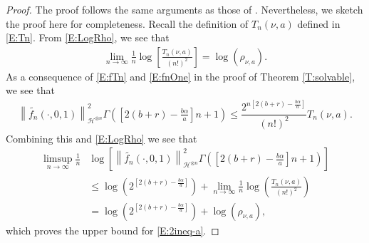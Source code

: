 \documentclass[a4paper,11pt]{article}
\numberwithin{equation}{section}
\numberwithin{equation}{section}
\theoremstyle{plain}
\theoremstyle{definition}
\newcommand{\Norm}[1]{\left\|  #1   \right\|}
\begin{document}
\begin{proof}
  The proof follows the same arguments as those of \cite[Lemma 4.3]{BCC21}. Nevertheless, we sketch
  the proof here for completeness. Recall the definition of $T_n(\nu,a)$ defined in \eqref{E:Tn}.
  From \eqref{E:LogRho}, we see that
  \begin{align} \label{E:LimTn}
    \lim_{n \to \infty} \frac{1}{n} \log \left[ \frac{T_n(\nu,a)}{(n!)^2} \right]
    = \log\left(\rho_{\nu,a}\right).
  \end{align}
  As a consequence of \eqref{E:fTn} and \eqref{E:fnOne} in the proof of Theorem \ref{T:solvable}, we
  see that
  \begin{align*}
    \Norm{ \widetilde{f_n}(\cdot,0,1) }_{ \mathcal{H}^{\otimes n} }^2 \Gamma\left( \left[ 2(b+r)- \frac{b \alpha}{a} \right] n +1 \right) \le \dfrac{2^{n\left[2(b+r)-\frac{b\alpha}{a}\right]}}{(n!)^2} T_n(\nu,a).
  \end{align*}
  Combining this and \eqref{E:LogRho} we see that
  \begin{align*}
    \limsup_{n \to \infty} \frac{1}{n}
    & \log\left[ \Norm{ \widetilde{f_n}(\cdot,0,1) }_{ \mathcal{H}^{\otimes n} }^2 \Gamma\left( \left[ 2(b+r)- \frac{b \alpha}{a} \right] n +1 \right)  \right] \\
    & \le \log\left( 2^{\left[2(b+r)-\frac{b\alpha}{a}\right]} \right) + \lim_{n \to \infty} \frac{1}{n} \log\left( \frac{T_n(\nu,a)}{(n!)^2} \right)           \\
    & = \log\left(  2^{\left[2(b+r)-\frac{b\alpha}{a}\right]} \right)  + \log(\rho_{\nu,a}),
  \end{align*}
  which proves the upper bound for \eqref{E:2ineq-a}.  \bigskip


\end{proof}
\end{document}
